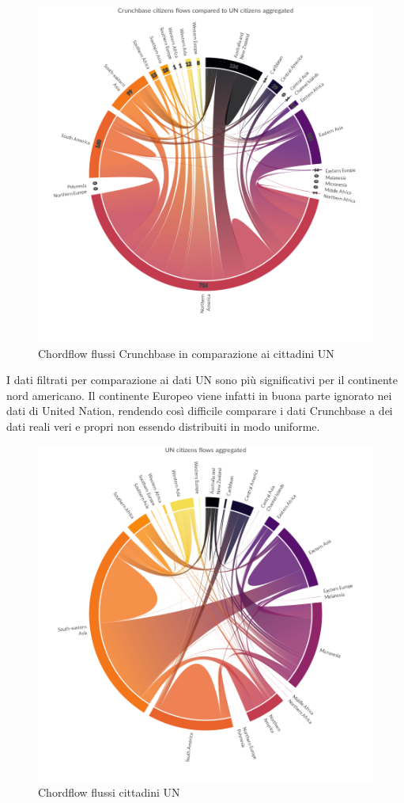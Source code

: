 \begin{figure}[t]
    \centering
    \includegraphics[width=1.0\textwidth]{images/ChordFlows/Crunchbase_cit_UN_True.png}
    \caption{Chordflow flussi Crunchbase in comparazione ai cittadini UN}
    \label{fig:chordcrunchuncittrue}
\end{figure}
I dati filtrati per comparazione ai dati UN sono più significativi per il continente nord americano. Il continente Europeo viene infatti in buona parte ignorato nei dati di United Nation, rendendo così difficile comparare i dati Crunchbase a dei dati reali veri e propri non essendo distribuiti in modo uniforme.
\begin{figure}[t]
    \centering
    \includegraphics[width=1.0\textwidth]{images/ChordFlows/UN_cit_True.png}
    \caption{Chordflow flussi cittadini UN}
    \label{fig:chorduncittrue}
\end{figure}
